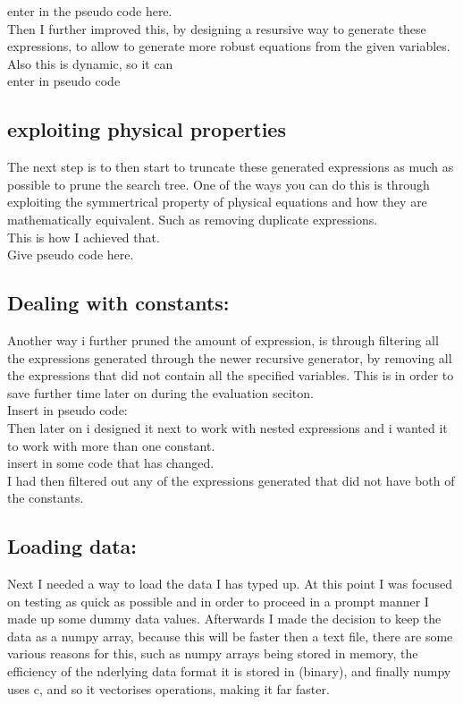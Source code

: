 \documentclass{article}
\begin{document}
enter in the pseudo code here.\\ 

Then I further improved this, by designing a resursive way to generate these expressions, to allow to generate more robust equations from the given variables. Also this is dynamic, so it can \\

enter in pseudo code\\

\subsection{exploiting physical properties}

The next step is to then start to truncate these generated expressions as much as possible to prune the search tree. One of the ways you can do this is through exploiting the symmertrical property of physical equations and how they are mathematically equivalent. Such as removing duplicate expressions.\\ 

This is how I achieved that.\\
Give pseudo code here. \\ 

\subsection{ Dealing with constants: }

Another way i further pruned the amount of expression, is through filtering all the expressions generated through the newer recursive generator, by removing all the expressions that did not contain all the specified variables. This is in order to save further time later on during the evaluation seciton.\\ 

Insert in pseudo code:\\

Then later on i designed it next to work with nested expressions and i wanted it to work with more than one constant.\\

insert in some code that has changed.\\

I had then filtered out any of the expressions generated that did not have both of the constants. \\ 


\subsection{ Loading data: }
Next I needed a way to load the data I has typed up. At this point I was focused on testing as quick as possible and in order to proceed in a prompt manner I made up some dummy data values. Afterwards I made the decision to keep the data as a numpy array, because this will be faster then a text file,  there are some various reasons for this, such as numpy arrays being stored in memory, the efficiency of the nderlying data format it is stored in (binary), and finally numpy uses c, and so it vectorises operations, making it far faster.\\ 
\end{document}
